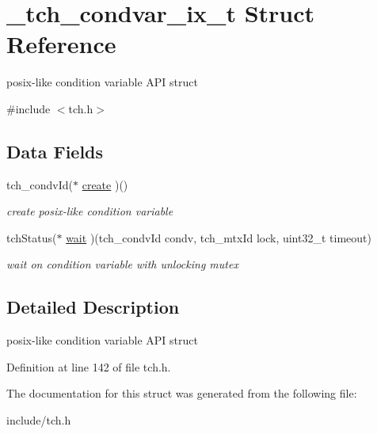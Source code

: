 \hypertarget{struct__tch__condvar__ix__t}{\section{\+\_\+tch\+\_\+condvar\+\_\+ix\+\_\+t Struct Reference}
\label{struct__tch__condvar__ix__t}
}


posix-\/like condition variable A\+P\+I struct  




{\ttfamily \#include $<$tch.\+h$>$}

\subsection*{Data Fields}
\begin{DoxyCompactItemize}
\item 
tch\+\_\+condv\+Id($\ast$ \hyperlink{group___a_p_i_ga4baf0cb2e2052176f805437c9d226b56}{create} )()
\begin{DoxyCompactList}\small\item\em create posix-\/like condition variable \end{DoxyCompactList}\item 
tch\+Status($\ast$ \hyperlink{group___a_p_i_ga4a12ede67ac36e7ce4e521144dd0c773}{wait} )(tch\+\_\+condv\+Id condv, tch\+\_\+mtx\+Id lock, uint32\+\_\+t timeout)
\begin{DoxyCompactList}\small\item\em wait on condition variable with unlocking mutex \end{DoxyCompactList}\end{DoxyCompactItemize}


\subsection{Detailed Description}
posix-\/like condition variable A\+P\+I struct 

Definition at line 142 of file tch.\+h.



The documentation for this struct was generated from the following file\+:\begin{DoxyCompactItemize}
\item 
include/tch.\+h\end{DoxyCompactItemize}
